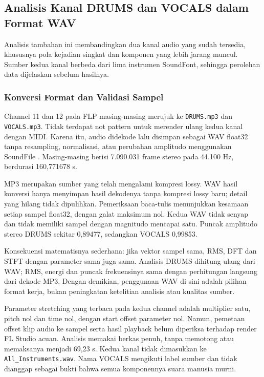 \subsection{Analisis Kanal DRUMS dan VOCALS dalam Format WAV}
Analisis tambahan ini membandingkan dua kanal audio yang sudah
tersedia, khususnya pola kejadian singkat dan komponen yang lebih
jarang muncul. Sumber kedua kanal berbeda dari lima instrumen
SoundFont, sehingga perolehan data dijelaskan sebelum hasilnya.

\subsubsection{Konversi Format dan Validasi Sampel}
Channel 11 dan 12 pada FLP masing-masing merujuk ke
\texttt{DRUMS.mp3} dan \texttt{VOCALS.mp3}. Tidak terdapat not pattern
untuk merender ulang kedua kanal dengan MIDI. Karena itu, audio
didekode lalu disimpan sebagai WAV float32 tanpa resampling,
normalisasi, atau perubahan amplitudo menggunakan SoundFile
\cite{soundfile}. Masing-masing berisi 7.090.031 frame stereo pada
44.100 Hz, berdurasi 160,771678 s.

MP3 merupakan sumber yang telah mengalami kompresi lossy. WAV hasil
konversi hanya menyimpan hasil dekodenya tanpa kompresi lossy baru;
detail yang hilang tidak dipulihkan. Pemeriksaan baca-tulis
menunjukkan kesamaan setiap sampel float32, dengan galat maksimum
nol. Kedua WAV tidak senyap dan tidak memiliki sampel dengan
magnitudo mencapai satu. Puncak amplitudo stereo DRUMS sekitar
0,89477, sedangkan VOCALS 0,99853.

Konsekuensi matematisnya sederhana: jika vektor sampel sama,
RMS, DFT dan STFT dengan parameter sama juga sama. Analisis DRUMS
dihitung ulang dari WAV; RMS, energi dan puncak frekuensinya sama
dengan perhitungan langsung dari dekode MP3. Dengan demikian, penggunaan WAV
di sini adalah pilihan format kerja, bukan peningkatan ketelitian
analisis atau kualitas sumber.

Parameter stretching yang terbaca pada kedua channel adalah
multiplier satu, pitch nol dan time nol, dengan start offset
parameter nol. Namun, pemetaan offset klip audio ke sampel serta
hasil playback belum diperiksa terhadap render FL Studio acuan.
Analisis memakai berkas penuh, tanpa memotong atau memaksanya menjadi
69,23 s. Kedua kanal tidak dimasukkan ke
\texttt{All\_Instruments.wav}. Nama VOCALS mengikuti label sumber
dan tidak dianggap sebagai bukti bahwa semua komponennya suara
manusia murni.

